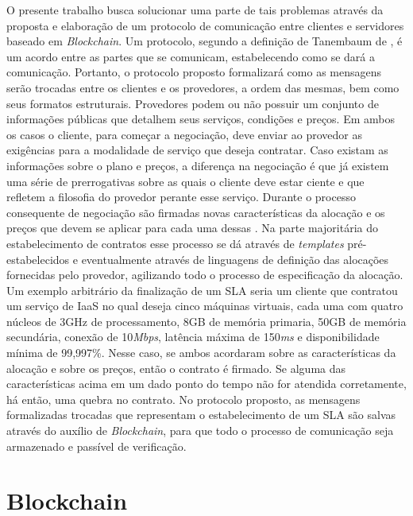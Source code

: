 %
O presente trabalho busca solucionar uma parte de tais problemas através da proposta e elaboração de um protocolo de comunicação entre clientes e servidores baseado em \textit{Blockchain}. 
%
Um protocolo, segundo a definição de Tanembaum de \citeyear{nuvem_sla:tanenbaum}, é um acordo entre as partes que se comunicam, estabelecendo como se dará a comunicação. Portanto, o protocolo proposto formalizará como as mensagens serão trocadas entre os clientes e os provedores, a ordem das mesmas, bem como seus formatos estruturais.
%
Provedores podem ou não possuir um conjunto de informações públicas que detalhem seus serviços, condições e preços. 
Em ambos os casos o cliente, para começar a negociação, deve enviar ao provedor as exigências para a modalidade de serviço que deseja contratar. Caso existam as informações sobre o plano e preços, a diferença na negociação é que já existem uma série de prerrogativas sobre as quais o cliente deve estar ciente e que refletem a filosofia do provedor perante esse serviço. Durante o processo consequente de negociação são firmadas novas características da alocação e os preços que devem se aplicar para cada uma dessas \cite{nuvem_sla:estabelecimento_contratos}. Na parte majoritária do estabelecimento de contratos esse processo se dá através de \textit{templates} pré-estabelecidos e eventualmente através de linguagens de definição das alocações fornecidas pelo provedor, agilizando todo o processo de especificação da alocação. Um exemplo arbitrário da finalização de um \ac{SLA} seria um cliente que contratou um serviço de \ac{IaaS} no qual deseja cinco máquinas virtuais, cada uma com quatro núcleos de 3GHz de processamento, 8GB de memória primaria, 50GB de memória secundária, conexão de 10\textit{Mbps}, latência máxima de 150\textit{ms} e disponibilidade mínima de 99,997\%. Nesse caso, se ambos acordaram sobre as características da alocação e sobre os preços, então o contrato é firmado. Se alguma das características acima em um dado ponto do tempo não for atendida corretamente, há então, uma quebra no contrato.
%
No protocolo proposto, as mensagens formalizadas trocadas que representam o estabelecimento de um \ac{SLA} são salvas através do auxílio de \textit{Blockchain}, para que todo o processo de comunicação seja armazenado e passível de verificação.
%


\section{Blockchain}
\label{sec:blockchain}

